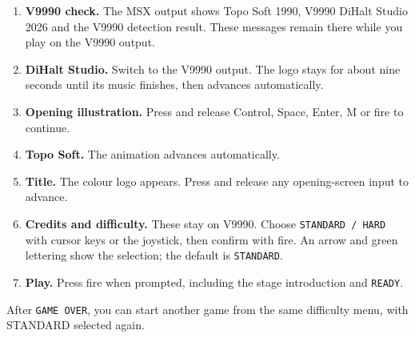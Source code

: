 \begin{enumerate}
\item \textbf{V9990 check.} The MSX output shows Topo Soft 1990, V9990 DiHalt Studio 2026 and the V9990 detection result. These messages remain there while you play on the V9990 output.
\item \textbf{DiHalt Studio.} Switch to the V9990 output. The logo stays for about nine seconds until its music finishes, then advances automatically.
\item \textbf{Opening illustration.} Press and release Control, Space, Enter, M or fire to continue.
\item \textbf{Topo Soft.} The animation advances automatically.
\item \textbf{Title.} The colour logo appears. Press and release any opening-screen input to advance.
\item \textbf{Credits and difficulty.} These stay on V9990. Choose \texttt{STANDARD / HARD} with cursor keys or the joystick, then confirm with fire. An arrow and green lettering show the selection; the default is \texttt{STANDARD}.
\item \textbf{Play.} Press fire when prompted, including the stage introduction and \texttt{READY}.
\end{enumerate}
After \texttt{GAME OVER}, you can start another game from the same difficulty menu, with STANDARD selected again.
